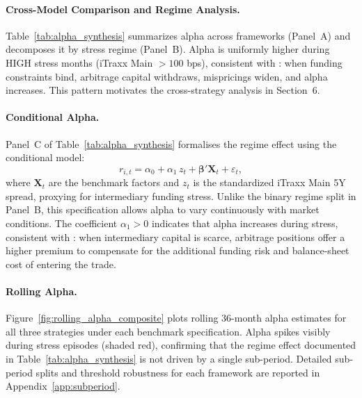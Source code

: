





\paragraph{Cross-Model Comparison and Regime Analysis.}
Table~\ref{tab:alpha_synthesis} summarizes alpha across frameworks
(Panel~A) and decomposes it by stress regime (Panel~B). Alpha is
uniformly higher during HIGH stress months (iTraxx Main $> 100$ bps),
consistent with \citet{duffie2010presidential}: when funding constraints bind,
arbitrage capital withdraws, mispricings widen, and alpha increases.
This pattern motivates the cross-strategy analysis in Section~6.



\paragraph{Conditional Alpha.}
Panel~C of Table~\ref{tab:alpha_synthesis} formalises the regime effect
using the \citet{ferson1996measuring} conditional model:
\begin{equation}\label{eq:ferson_schadt}
  r_{i,t} = \alpha_0 + \alpha_1\, z_t
  + \boldsymbol{\beta}' \mathbf{X}_t + \varepsilon_t,
\end{equation}
where $\mathbf{X}_t$ are the benchmark factors and $z_t$ is the
standardized iTraxx Main 5Y spread, proxying for intermediary funding
stress. Unlike the binary regime split in Panel~B, this specification
allows alpha to vary continuously with market conditions.
The coefficient $\alpha_1 > 0$ indicates that alpha increases during
stress, consistent with \citet{duffie2010presidential}: when
intermediary capital is scarce, arbitrage positions offer a higher
premium to compensate for the additional funding risk and
balance-sheet cost of entering the trade.

\paragraph{Rolling Alpha.}

Figure~\ref{fig:rolling_alpha_composite} plots rolling 36-month alpha
estimates for all three strategies under each benchmark specification.
Alpha spikes visibly during stress episodes (shaded red), confirming
that the regime effect documented in Table~\ref{tab:alpha_synthesis}
is not driven by a single sub-period. Detailed sub-period splits
and threshold robustness for each framework are reported in
Appendix~\ref{app:subperiod}.


